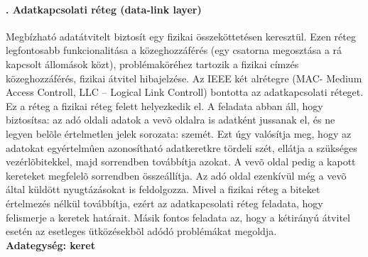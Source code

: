 \paragraph[Adatkapcsolati réteg]{. Adatkapcsolati réteg (data-link layer)}
Megbízható adatátvitelt biztosít egy fizikai összeköttetésen keresztül. Ezen réteg legfontosabb funkcionalitása a közeghozzáférés (egy csatorna megosztása a rá kapcsolt állomások közt), problémaköréhez tartozik a fizikai címzés közeghozzáférés, fizikai átvitel hibajelzése. Az IEEE két alrétegre (MAC- Medium Access Controll, LLC – Logical Link Controll) bontotta az adatkapcsolati réteget.\\
{\footnotesize Ez a réteg a fizikai réteg felett helyezkedik el. A feladata abban áll, hogy biztosítsa: az adó oldali adatok a vevõ oldalra is adatként jussanak el, és ne legyen belõle értelmetlen jelek sorozata: szemét. Ezt úgy valósítja meg, hogy az adatokat egyértelmûen azonosítható adatkeretkre tördeli szét, ellátja a szükséges vezérlõbitekkel, majd sorrendben továbbítja azokat. A vevõ oldal pedig a kapott kereteket megfelelõ sorrendben összeállítja. Az adó oldal ezenkívül még a vevõ által küldött nyugtázásokat is feldolgozza. Mivel a fizikai réteg a biteket értelmezés nélkül továbbítja, ezért az adatkapcsolati réteg feladata, hogy felismerje a keretek határait. Másik fontos feladata az, hogy a kétirányú átvitel esetén az esetleges ütközésekbõl adódó problémákat megoldja.}\\
\textbf{Adategység: keret}
